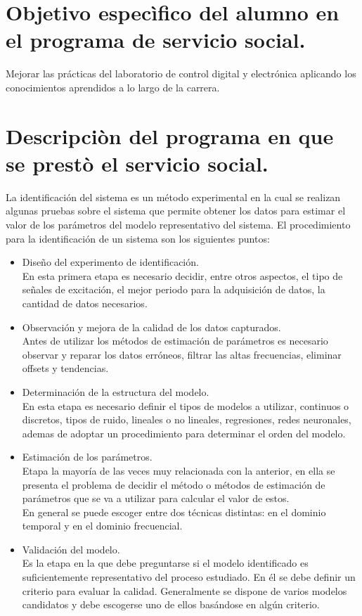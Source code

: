 \documentclass[a4paper,12pt]{article}
\begin{document}
    \section{Objetivo especìfico del alumno en el programa de servicio social.}
        Mejorar las prácticas del laboratorio de control digital y electrónica aplicando los conocimientos aprendidos a lo largo de la carrera.

    \section{Descripciòn del programa en que se prestò el servicio social.}
        La identificación del sistema es un método experimental en la cual se realizan algunas pruebas sobre el sistema que permite obtener los datos para estimar el valor de los parámetros del modelo representativo del sistema.
        El procedimiento para la identificación de un sistema son los siguientes puntos:
        \begin{itemize}
            \item Diseño del experimento de identificación.\\
            En esta primera etapa es necesario decidir, entre otros aspectos, el tipo de señales de excitación, el mejor periodo para la adquisición de datos, la cantidad de datos necesarios.
            
            \item Observación y mejora de la calidad de los datos capturados.\\ 
            Antes de utilizar los métodos de estimación de parámetros es necesario observar y reparar los datos erróneos, filtrar las altas frecuencias, eliminar offsets y tendencias.

            \item Determinación de la estructura del modelo.\\ 
            En esta etapa es necesario definir el tipos de modelos a   utilizar, continuos   o   discretos, tipos   de   ruido,   lineales   o   no   lineales,   regresiones,   redes neuronales, ademas de adoptar un procedimiento para determinar el orden del modelo.

            \item Estimación de los parámetros.\\
            Etapa la mayoría de las veces muy relacionada con la anterior, en ella se presenta el problema de decidir el método o métodos de estimación de parámetros que se va a utilizar para calcular el valor de estos.\\ 
            En general se puede escoger entre dos técnicas distintas: en el dominio temporal y en el dominio frecuencial.
            
            \item Validación del modelo.\\  
            Es la etapa en la que debe preguntarse si el modelo identificado es suficientemente representativo del proceso estudiado. En él se debe definir un criterio para evaluar la calidad. Generalmente se dispone de varios modelos candidatos y debe escogerse uno de ellos basándose en algún criterio.
        \end{itemize}
\end{document}
